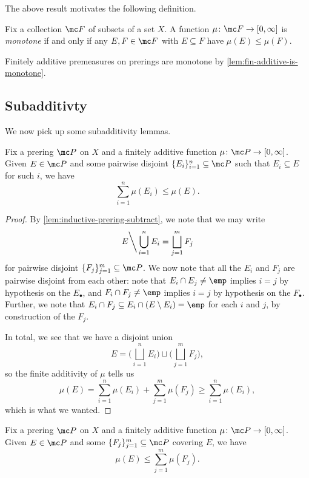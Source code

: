 \documentclass[../notes.tex]{subfiles}
\begin{document}
The above result motivates the following definition.
\begin{definition}[Monotone]
	Fix a collection $\mc F$ of subsets of a set $X$. A function $\mu\colon\mc F\to[0,\infty]$ is \textit{monotone} if and only if any $E,F\in\mc F$ with $E\subseteq F$ have $\mu(E)\le\mu(F)$.
\end{definition}
\begin{example}
	Finitely additive premeasures on prerings are monotone by \autoref{lem:fin-additive-is-monotone}.
\end{example}

\subsection{Subadditivty}
We now pick up some subadditivity lemmas.
\begin{lemma} \label{lem:almost-subadditive}
	Fix a prering $\mc P$ on $X$ and a finitely additive function $\mu\colon\mc P\to[0,\infty]$. Given $E\in\mc P$ and some pairwise disjoint $\{E_i\}_{i=1}^n\subseteq\mc P$ such that $E_i\subseteq E$ for such $i$, we have
	\[\sum_{i=1}^n\mu(E_i)\le\mu(E).\]
\end{lemma}
\begin{proof}
	By \autoref{lem:inductive-prering-subtract}, we note that we may write
	\[E{\mathbin\bigg\backslash}\bigcup_{i=1}^nE_i=\bigsqcup_{j=1}^mF_j\]
	for pairwise disjoint $\{F_j\}_{j=1}^m\subseteq\mc P$. We now note that all the $E_i$ and $F_j$ are pairwise disjoint from each other: note that $E_i\cap E_j\ne\emp$ implies $i=j$ by hypothesis on the $E_\bullet$, and $F_i\cap F_j\ne\emp$ implies $i=j$ by hypothesis on the $F_\bullet$. Further, we note that $E_i\cap F_j\subseteq E_i\cap(E\setminus E_i)=\emp$ for each $i$ and $j$, by construction of the $F_j$.

	In total, we see that we have a disjoint union
	\[E=\Bigg(\bigsqcup_{i=1}^nE_i\Bigg)\sqcup\Bigg(\bigsqcup_{j=1}^mF_j\Bigg),\]
	so the finite additivity of $\mu$ tells us
	\[\mu(E)=\sum_{i=1}^n\mu(E_i)+\sum_{j=1}^m\mu(F_j)\ge\sum_{i=1}^n\mu(E_i),\]
	which is what we wanted.
\end{proof}
\begin{lemma}
	Fix a prering $\mc P$ on $X$ and a finitely additive function $\mu\colon\mc P\to[0,\infty]$. Given $E\in\mc P$ and some $\{F_j\}_{j=1}^m\subseteq\mc P$ covering $E$, we have
	\[\mu(E)\le\sum_{j=1}^m\mu(F_j).\]
\end{lemma}
\end{document}
